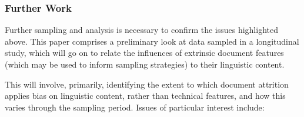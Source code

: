 







\subsubsection{Further Work}
Further sampling and analysis is necessary to confirm the issues highlighted above.  This paper comprises a preliminary look at data sampled in a longitudinal study, which will go on to relate the influences of extrinsic document features (which may be used to inform sampling strategies) to their linguistic content.  

This will involve, primarily, identifying the extent to which document attrition applies bias on linguistic content, rather than technical features, and how this varies through the sampling period.  Issues of particular interest include:

